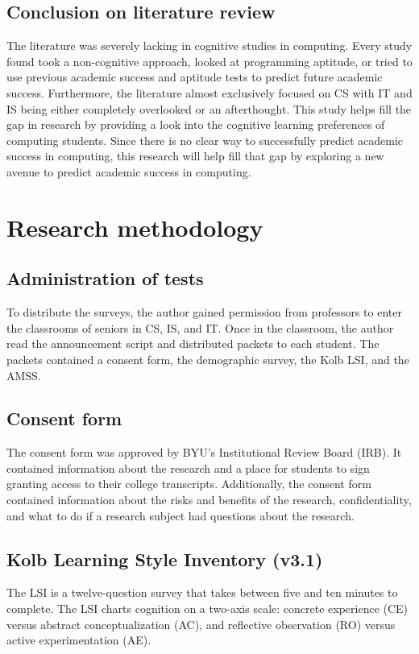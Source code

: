 \subsection{Conclusion on literature review}
The literature was severely lacking in cognitive studies in computing. Every study found took a non-cognitive approach, looked at programming aptitude, or tried to use previous academic success and aptitude tests to predict future academic success. Furthermore, the literature almost exclusively focused on CS with IT and IS being either completely overlooked or an afterthought. This study helps fill the gap in research by providing a look into the cognitive learning preferences of computing students. Since there is no clear way to successfully predict academic success in computing, this research will help fill that gap by exploring a new avenue to predict academic success in computing.

\section{Research methodology}
\subsection{Administration of tests}
To distribute the surveys, the author gained permission from professors to enter the classrooms of seniors in CS, IS, and IT. Once in the classroom, the author read the announcement script and distributed packets to each student. The packets contained a consent form, the demographic survey, the Kolb LSI, and the AMSS.

\subsection{Consent form}
The consent form was approved by BYU's Institutional Review Board (IRB). It contained information about the research and a place for students to sign granting access to their college transcripts. Additionally, the consent form contained information about the risks and benefits of the research, confidentiality, and what to do if a research subject had questions about the research.

\subsection{Kolb Learning Style Inventory (v3.1)}
The LSI is a twelve-question survey that takes between five and ten minutes to complete. The LSI charts cognition on a two-axis scale: concrete experience (CE) versus abstract conceptualization (AC), and reflective observation (RO) versus active experimentation (AE).

